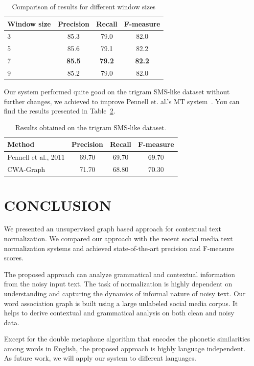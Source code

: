 \documentclass[a4paper,onesided,12pt]{report}
\begin{document}
\begin{table}[thb]
  \caption{Comparison of results for different window sizes}
  \centering
  \begin{tabular}[th]{lccc}
    \hline
    Window size & Precision & Recall & F-measure \\
    \hline
    3 & 85.3 & 79.0 & 82.0 \\
    5 & 85.6 & 79.1 & 82.2 \\
    7 & \textbf{85.5} &  \textbf{79.2} &  \textbf{82.2} \\
    9 & 85.2 & 79.0  & 82.0 \\
    \hline
  \end{tabular}
\label{tab:windows}
\end{table}

Our system performed quite good on the trigram SMS-like dataset without further changes, we achieved to improve Pennell et. al.'s MT system~\cite{pennell2011character}. You can find the results presented in Table~\ref{tab:resultspennell}.

\begin{table}[thb]
  \caption{Results obtained on the trigram SMS-like dataset.}
  \centering
  \begin{tabular}[t]{lccc}
    \hline
    Method & Precision & Recall & F-measure \\
    \hline
    Pennell et al., 2011 & 69.70 & 69.70 & 69.70 \\
    CWA-Graph   & 71.70 & 68.80 & 70.30 \\
    \hline
  \end{tabular}
  \label{tab:resultspennell}
\end{table}

\chapter{CONCLUSION}

We presented an unsupervised graph based approach for contextual text normalization. We compared our approach with the recent social media text normalization systems and achieved state-of-the-art precision and F-measure scores.

The proposed approach can analyze grammatical and contextual information from the noisy input text. The task of normalization is highly dependent on understanding and capturing the dynamics of informal nature of noisy text. Our word association graph is built using a large unlabeled social media corpus. It helps to derive contextual and grammatical analysis on both clean and noisy data.

Except for the double metaphone algorithm that encodes the phonetic similarities among words in English, the proposed approach is highly language independent. As future work, we will apply our system to different languages.


\end{document}

